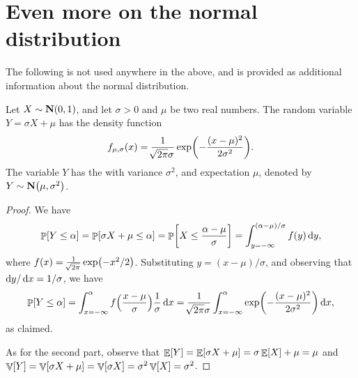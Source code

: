
\section{Even more on the normal distribution}

The following is not used anywhere in the above, and is provided as
additional information about the normal distribution.

\begin{lemma}
    Let $X \sim \NormalY{0}{1}$, and let $\sigma > 0$ and $\mu$ be two
    real numbers. The random variable $Y = \sigma X + \mu$ has the
    density function
    \begin{equation}
        f_{\mu,\sigma}(x) = \frac{1}{\mysqrt{2\pi} \sigma} \exp\pth{
           -\frac{(x-\mu)^2}{2\sigma^2}}.
        \eqlab{normal:density:g}
    \end{equation}
    The variable $Y$ has the  with variance
    $\sigma^2$, and expectation $\mu$, denoted by
    $Y \sim \NormalY{\mu}{\sigma^2}$.
\end{lemma}
\begin{proof}
    We have
    \begin{equation*}
        \Prob{Y \leq \alpha}%
        =%
        \Prob{\sigma X + \mu \leq \alpha}%
        =%
        \Prob{ X \leq \frac{\alpha-\mu}{\sigma}}%
        =%
        \int_{y=-\infty}^{(\alpha-\mu)/{\sigma}} f(y) \diffX{y},
    \end{equation*}
    where $f(x) = \frac{1}{\mysqrt{2\pi}} \exp \pth{ -x^2/2}$.
    Substituting $y= (x - \mu)/\sigma$, and observing that
    $\mathop{}\!\mathrm{d}y/\mathop{}\!\mathrm{d}x = 1/\sigma$, we have
    \begin{equation*}
        \Prob{Y \leq \alpha}%
        =%
        \int_{x=-\infty}^{\alpha} f\Bigl( \frac{x-\mu}{\sigma} \Bigr)
        \frac{1}{\sigma} \diffX{x}%
        =%
        \frac{1}{\mysqrt{2\pi} \sigma}
        \int_{x=-\infty}^{\alpha} 
        \exp \pth{ -\frac{(x-\mu)^2}{2\sigma^2}} \diffX{x},
    \end{equation*}
    as claimed.

    As for the second part, observe that
    $\mathop{\mathbb{E}}\!\left[ {Y} \right] = \mathop{\mathbb{E}}\!\left[ {\sigma X + \mu } \right] = \sigma\mathop{\mathbb{E}}\!\left[ {X} \right] + \mu = \mu$ and
    $\mathop{\mathbb{V}}\!\left[ {Y} \right] = \mathop{\mathbb{V}}\!\left[ {\sigma X + \mu } \right] = \mathop{\mathbb{V}}\!\left[ {\sigma X } \right] = \sigma^2
    \mathop{\mathbb{V}}\!\left[ {X} \right] = \sigma^2$.
\end{proof}



